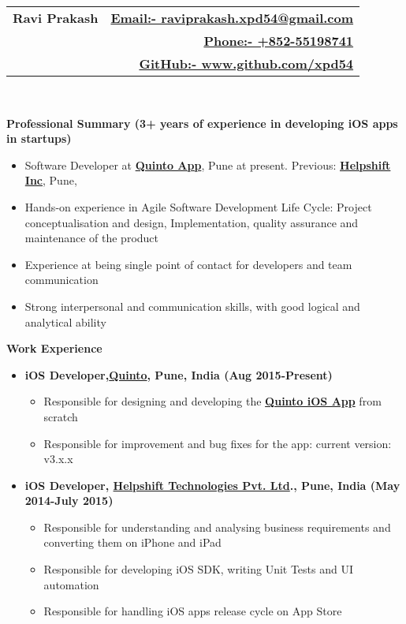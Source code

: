 \documentclass[letterpaper,11pt]{article}
\newcommand{\resitem}[1]{\item #1 \vspace{-2pt}}
\newcommand{\resheading}[1]{{\large \colorbox{mygrey}{\begin{minipage}{\textwidth}{\textbf{#1 \vphantom{p\^{E}}}}\end{minipage}}}}
\begin{document}
\newcommand{\mywebheader}{
\begin{tabular*}{7in}{l@{\extracolsep{\fill}}r}
	\textbf{\Huge \bfseries Ravi Prakash} 
	& \href{mailto:raviprakash.xpd54@gmail.com}{\normalsize \bfseries Email:- \mdseries raviprakash.xpd54@gmail.com}\\
	 & \href{tel:+85255198741}{\normalsize \bfseries Phone:- \mdseries +852-55198741}\\
	 & \href{http://www.github.com/xpd54}{\normalsize \bfseries GitHub:- \mdseries www.github.com/xpd54}\\
	\end{tabular*}
\\}
\mywebheader

\resheading{\Large Professional Summary \normalsize \bfseries (3+ years of experience in developing iOS apps in startups)}
{ \footnotesize
\begin{itemize}
	\resitem{Software Developer at \href{http://quintoapp.com}{\bfseries Quinto App}, Pune at present. Previous: \href{helpshift.com} {\bfseries  Helpshift Inc}, Pune,}
	\resitem{Hands-on experience in Agile Software Development Life Cycle: Project conceptualisation and design, Implementation,
quality assurance and maintenance of the product}
	\resitem{Experience at being single point of contact for developers and team communication}
	\resitem{Strong interpersonal and communication skills, with good logical and analytical ability}
\end{itemize}
} %

\resheading{Work Experience}
	\begin{itemize}
	\resitem {{\bfseries iOS Developer,\href{http://quintoapp.com} {Quinto}, Pune, India (Aug 2015-Present)}}
				{ \footnotesize
				\begin{itemize}
					\resitem{Responsible for designing and developing the \href{https://itunes.apple.com/in/app/id912305961}{\bfseries Quinto iOS App} from scratch}
					\resitem{Responsible for improvement and bug fixes for the app: current version: v3.x.x}
				\end{itemize}
				}
	\resitem {{\bfseries iOS Developer, \href{https://helpshift.com}{\bfseries Helpshift Technologies Pvt. Ltd}., Pune, India (May 2014-July 2015)}}
				{ \footnotesize
				\begin{itemize}
					\resitem{Responsible for understanding and analysing business requirements and converting them on iPhone and iPad}
					\resitem{Responsible for developing iOS SDK, writing Unit Tests and UI automation}
					\resitem{Responsible for handling iOS apps release cycle on App Store}
				\end{itemize}
				}
\end{itemize}  %
\end{document}
